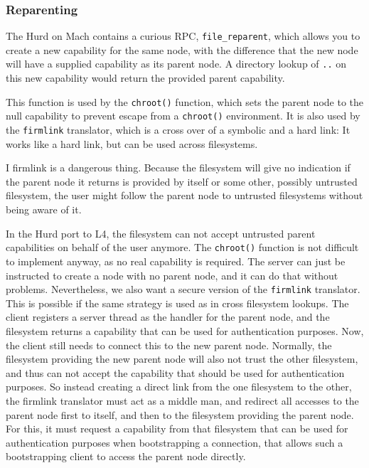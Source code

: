 \documentclass[9pt,a4paper]{extarticle}
\begin{document}
\subsubsection{Reparenting}

The Hurd on Mach contains a curious RPC, \verb/file_reparent/, which
allows you to create a new capability for the same node, with the
difference that the new node will have a supplied capability as its
parent node.  A directory lookup of \texttt{..} on this new capability
would return the provided parent capability.

This function is used by the \texttt{chroot()} function, which sets
the parent node to the null capability to prevent escape from a
\texttt{chroot()} environment.  It is also used by the
\texttt{firmlink} translator, which is a cross over of a symbolic and
a hard link: It works like a hard link, but can be used across
filesystems.

I firmlink is a dangerous thing.  Because the filesystem will give no
indication if the parent node it returns is provided by itself or some
other, possibly untrusted filesystem, the user might follow the parent
node to untrusted filesystems without being aware of it.

In the Hurd port to L4, the filesystem can not accept untrusted parent
capabilities on behalf of the user anymore.  The \texttt{chroot()}
function is not difficult to implement anyway, as no real capability
is required.  The server can just be instructed to create a node with
no parent node, and it can do that without problems.  Nevertheless, we
also want a secure version of the \texttt{firmlink} translator.  This
is possible if the same strategy is used as in cross filesystem
lookups.  The client registers a server thread as the handler for the
parent node, and the filesystem returns a capability that can be used
for authentication purposes.  Now, the client still needs to connect
this to the new parent node.  Normally, the filesystem providing the
new parent node will also not trust the other filesystem, and thus can
not accept the capability that should be used for authentication
purposes.  So instead creating a direct link from the one filesystem
to the other, the firmlink translator must act as a middle man, and
redirect all accesses to the parent node first to itself, and then to
the filesystem providing the parent node.  For this, it must request a
capability from that filesystem that can be used for authentication
purposes when bootstrapping a connection, that allows such a
bootstrapping client to access the parent node directly.
\end{document}
